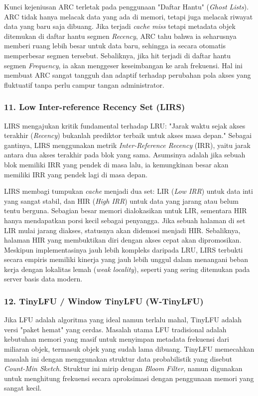 Kunci kejeniusan ARC terletak pada penggunaan "Daftar Hantu"
(\textit{Ghost Lists}).
ARC tidak hanya melacak data yang ada di memori, tetapi juga melacak
riwayat data yang baru saja dibuang.
Jika terjadi \textit{cache miss} tetapi metadata objek ditemukan di
daftar hantu segmen \textit{Recency}, ARC tahu bahwa ia seharusnya
memberi ruang lebih besar untuk data baru, sehingga ia secara
otomatis memperbesar segmen tersebut.
Sebaliknya, jika hit terjadi di daftar hantu segmen
\textit{Frequency}, ia akan menggeser keseimbangan ke arah frekuensi.
Hal ini membuat ARC sangat tangguh dan adaptif terhadap perubahan
pola akses yang fluktuatif tanpa perlu campur tangan administrator.

\subsubsection{11. Low Inter-reference Recency Set (LIRS)}
LIRS mengajukan kritik fundamental terhadap LRU: "Jarak waktu sejak
akses terakhir (\textit{Recency}) bukanlah prediktor terbaik untuk
akses masa depan."
Sebagai gantinya, LIRS menggunakan metrik \textit{Inter-Reference
Recency} (IRR), yaitu jarak antara dua akses terakhir pada blok yang sama.
Asumsinya adalah jika sebuah blok memiliki IRR yang pendek di masa
lalu, ia kemungkinan besar akan memiliki IRR yang pendek lagi di masa depan.

LIRS membagi tumpukan \textit{cache} menjadi dua set: LIR
(\textit{Low IRR}) untuk data inti yang sangat stabil, dan HIR
(\textit{High IRR}) untuk data yang jarang atau belum tentu berguna.
Sebagian besar memori dialokasikan untuk LIR, sementara HIR hanya
mendapatkan porsi kecil sebagai penyangga.
Jika sebuah halaman di set LIR mulai jarang diakses, statusnya akan
didemosi menjadi HIR.
Sebaliknya, halaman HIR yang membuktikan diri dengan akses cepat akan
dipromosikan.
Meskipun implementasinya jauh lebih kompleks daripada LRU, LIRS
terbukti secara empiris memiliki kinerja yang jauh lebih unggul dalam
menangani beban kerja dengan lokalitas lemah (\textit{weak
locality}), seperti yang sering ditemukan pada server basis data modern.

\subsubsection{12. TinyLFU / Window TinyLFU (W-TinyLFU)}
Jika LFU adalah algoritma yang ideal namun terlalu mahal, TinyLFU
adalah versi "paket hemat" yang cerdas.
Masalah utama LFU tradisional adalah kebutuhan memori yang masif
untuk menyimpan metadata frekuensi dari miliaran objek, termasuk
objek yang sudah lama dibuang.
TinyLFU memecahkan masalah ini dengan menggunakan struktur data
probabilistik yang disebut \textit{Count-Min Sketch}.
Struktur ini mirip dengan \textit{Bloom Filter}, namun digunakan
untuk menghitung frekuensi secara aproksimasi dengan penggunaan
memori yang sangat kecil.


